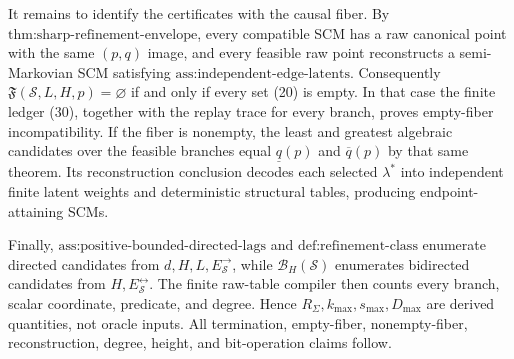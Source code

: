 It remains to identify the certificates with the causal fiber.  By \(\text{thm:sharp-refinement-envelope}\), every compatible SCM has a raw canonical point with the same \((p,q)\) image, and every feasible raw point reconstructs a semi-Markovian SCM satisfying \(\text{ass:independent-edge-latents}\).  Consequently \(\mathfrak F(\mathcal S,L,H,p)=\varnothing\) if and only if every set (20) is empty.  In that case the finite ledger (30), together with the replay trace for every branch, proves empty-fiber incompatibility.  If the fiber is nonempty, the least and greatest algebraic candidates over the feasible branches equal \(\underline q(p)\) and \(\overline q(p)\) by that same theorem.  Its reconstruction conclusion decodes each selected \(\lambda^*\) into independent finite latent weights and deterministic structural tables, producing endpoint-attaining SCMs.

Finally, \(\text{ass:positive-bounded-directed-lags}\) and \(\text{def:refinement-class}\) enumerate directed candidates from \(d,H,L,E_{\mathcal S}^{\to}\), while \(\mathcal B_H(\mathcal S)\) enumerates bidirected candidates from \(H,E_{\mathcal S}^{\leftrightarrow}\).  The finite raw-table compiler then counts every branch, scalar coordinate, predicate, and degree.  Hence \(R_{\Sigma},k_{\max},s_{\max},D_{\max}\) are derived quantities, not oracle inputs.  All termination, empty-fiber, nonempty-fiber, reconstruction, degree, height, and bit-operation claims follow.
